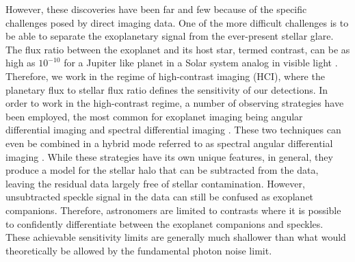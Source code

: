 \documentclass[referee]{aa} %
\begin{document}
However, these discoveries have been far and few because of the specific challenges posed by direct imaging data.
One of the more difficult challenges is to be able to separate the exoplanetary signal from the ever-present stellar glare.
The flux ratio between the exoplanet and its host star, termed contrast, can be as high as $10^{-10}$ for a Jupiter like planet in a Solar system analog in visible light \citep[e.g.,][]{2023Galicher}.
Therefore, we work in the regime of high-contrast imaging (HCI), where the planetary flux to stellar flux ratio defines the sensitivity of our detections.
In order to work in the high-contrast regime, a number of observing strategies have been employed, the most common for exoplanet imaging being angular differential imaging \citep[ADI, ][]{Liu2004,2006MaroisADI} and spectral differential imaging \citep[SDI, ][]{2002SparksSDI}. These two techniques can even be combined in a hybrid mode referred to as spectral angular differential imaging \citep[SADI, e.g.,][]{2019ChristiaensPDS70}.
While these strategies have its own unique features, in general, they produce a model for the stellar halo that can be subtracted from the data, leaving the residual data largely free of stellar contamination.
However, unsubtracted speckle signal in the data can still be confused as exoplanet companions.
Therefore, astronomers are limited to contrasts where it is possible to confidently differentiate between the exoplanet companions and speckles. These achievable sensitivity limits are generally much shallower than what would theoretically be allowed by the fundamental photon noise limit.
\end{document}
